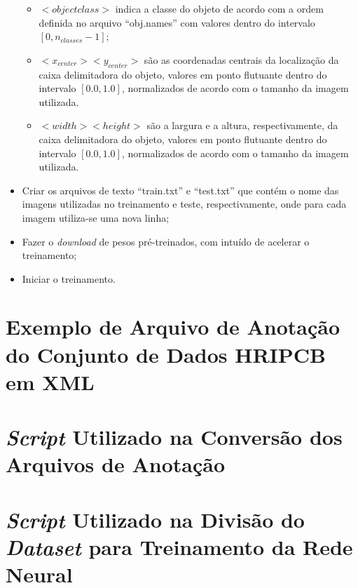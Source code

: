 \begin{itemize}
  \begin{itemize}
    \item $<objectclass>$ indica a classe do objeto de acordo com a ordem definida no arquivo ``obj.names'' com valores dentro do intervalo $[0, n_{classes} - 1]$;
    \item $<x_{center}> <y_{center}>$ são as coordenadas centrais da localização da caixa delimitadora do objeto, valores em ponto flutuante dentro do intervalo $[0.0, 1.0]$, normalizados de acordo com o tamanho da imagem utilizada.
    \item $<width> <height>$ são a largura e a altura, respectivamente, da caixa delimitadora do objeto, valores em ponto flutuante dentro do intervalo $[0.0, 1.0]$, normalizados de acordo com o tamanho da imagem utilizada.
  \end{itemize}
  \item Criar os arquivos de texto ``train.txt'' e ``test.txt'' que contém o nome das imagens utilizadas no treinamento e teste, respectivamente, onde para cada imagem utiliza-se uma nova linha;
  \item Fazer o \textit{download} de pesos pré-treinados, com intuído de acelerar o treinamento;
  \item Iniciar o treinamento.
\end{itemize}

\chapter{Exemplo de Arquivo de Anotação do Conjunto de Dados HRIPCB em XML} \label{apendice:hripcb-xml}


\chapter{\textit{Script} Utilizado na Conversão dos Arquivos de Anotação} \label{apendice:conversao}


\chapter{\textit{Script} Utilizado na Divisão do \textit{Dataset} para Treinamento da Rede Neural} \label{apendice:divisao}








